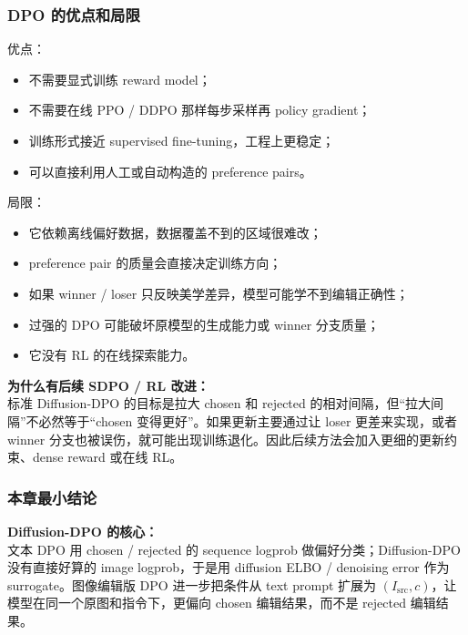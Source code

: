 \subsubsection{DPO 的优点和局限}

优点：

\begin{itemize}[leftmargin=1.5em]
  \item 不需要显式训练 reward model；
  \item 不需要在线 PPO / DDPO 那样每步采样再 policy gradient；
  \item 训练形式接近 supervised fine-tuning，工程上更稳定；
  \item 可以直接利用人工或自动构造的 preference pairs。
\end{itemize}

局限：

\begin{itemize}[leftmargin=1.5em]
  \item 它依赖离线偏好数据，数据覆盖不到的区域很难改；
  \item preference pair 的质量会直接决定训练方向；
  \item 如果 winner / loser 只反映美学差异，模型可能学不到编辑正确性；
  \item 过强的 DPO 可能破坏原模型的生成能力或 winner 分支质量；
  \item 它没有 RL 的在线探索能力。
\end{itemize}

\begin{warnbox}
\textbf{为什么有后续 SDPO / RL 改进：}\\
标准 Diffusion-DPO 的目标是拉大 chosen 和 rejected 的相对间隔，但“拉大间隔”不必然等于“chosen 变得更好”。如果更新主要通过让 loser 更差来实现，或者 winner 分支也被误伤，就可能出现训练退化。因此后续方法会加入更细的更新约束、dense reward 或在线 RL。
\end{warnbox}

\subsubsection{本章最小结论}

\begin{summarybox}
\textbf{Diffusion-DPO 的核心：}\\
文本 DPO 用 chosen / rejected 的 sequence logprob 做偏好分类；Diffusion-DPO 没有直接好算的 image logprob，于是用 diffusion ELBO / denoising error 作为 surrogate。图像编辑版 DPO 进一步把条件从 text prompt 扩展为 $(I_\text{src},c)$，让模型在同一个原图和指令下，更偏向 chosen 编辑结果，而不是 rejected 编辑结果。
\end{summarybox}

